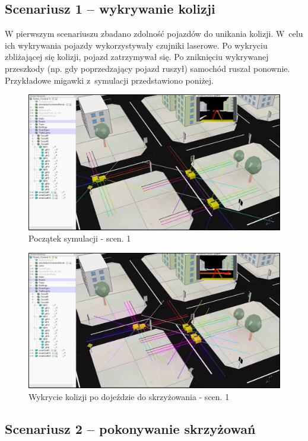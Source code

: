 
\subsection{Scenariusz 1 -- wykrywanie kolizji}

W pierwszym scenariuszu zbadano zdolność pojazdów do unikania kolizji. W~celu ich wykrywania pojazdy wykorzystywały czujniki laserowe. Po wykryciu zbliżającej się kolizji, pojazd zatrzymywał się. Po zniknięciu wykrywanej przeszkody (np. gdy poprzedzający pojazd ruszył) samochód ruszał ponownie. Przykładowe migawki z~symulacji przedstawiono poniżej. \vspace{-0.1cm}

\begin{figure}[H]
	\centering
	\centering
	\includegraphics[width=.7\linewidth]{p11.jpg}
	\caption{Początek symulacji - scen. 1}
	\label{fig:p11}
\end{figure} \vspace{-0.5cm}

\begin{figure}[H]
	\centering
	\centering
	\includegraphics[width=.7\linewidth]{p12.jpg}
	\caption{Wykrycie kolizji po dojeździe do skrzyżowania - scen. 1}
	\label{fig:p12}
\end{figure}

\subsection{Scenariusz 2 -- pokonywanie skrzyżowań}

